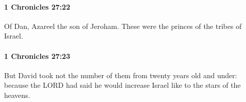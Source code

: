 		\paragraph{1 Chronicles 27:22} %
			\label{1CHRONICLES-27-22}

			Of Dan, Azareel the son of Jeroham. These were the princes of the tribes of Israel.


		\paragraph{1 Chronicles 27:23} %
			\label{1CHRONICLES-27-23}

			But David took not the number of them from twenty years old and under: because the LORD had said he would increase Israel like to the stars of the heavens.


